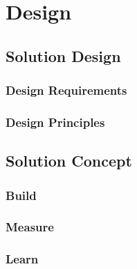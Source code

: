 
\chapter{Design}

\ifpdf
    \graphicspath{{Chapters/Design/Figs/}{Chapters/Design/Figs/}{Chapters/Design/Figs/}}
\else
    \graphicspath{{Chapters/Design/Figs/}{Chapters/Design/Figs/}}
\fi
\section{Solution Design}

\subsection{Design Requirements}

\subsection{Design Principles}

\section{Solution Concept}

\subsection{Build}

\subsection{Measure}

\subsection{Learn}
